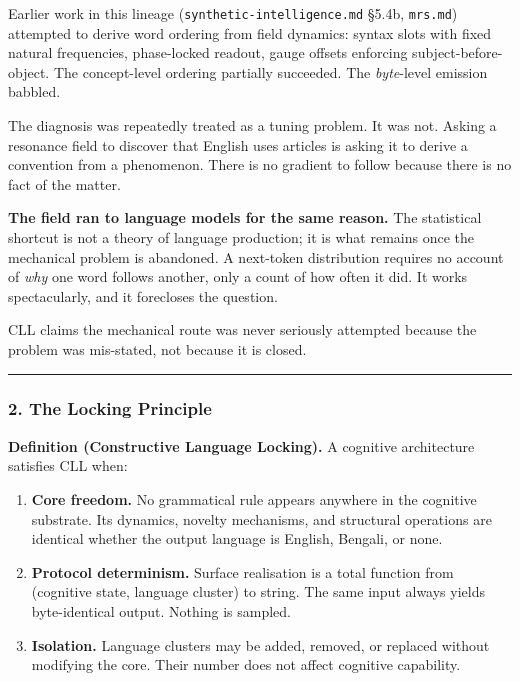 \documentclass[
  11pt,
  a4paper,
]{article}
\providecommand{\tightlist}{%
  \setlength{\itemsep}{0pt}\setlength{\parskip}{0pt}}
\begin{document}
Earlier work in this lineage (\texttt{synthetic-intelligence.md} §5.4b,
\texttt{mrs.md}) attempted to derive word ordering from field dynamics:
syntax slots with fixed natural frequencies, phase-locked readout, gauge
offsets enforcing subject-before-object. The concept-level ordering
partially succeeded. The \emph{byte}-level emission babbled.

The diagnosis was repeatedly treated as a tuning problem. It was not.
Asking a resonance field to discover that English uses articles is
asking it to derive a convention from a phenomenon. There is no gradient
to follow because there is no fact of the matter.

\textbf{The field ran to language models for the same reason.} The
statistical shortcut is not a theory of language production; it is what
remains once the mechanical problem is abandoned. A next-token
distribution requires no account of \emph{why} one word follows another,
only a count of how often it did. It works spectacularly, and it
forecloses the question.

CLL claims the mechanical route was never seriously attempted because
the problem was mis-stated, not because it is closed.

\begin{center}\rule{0.5\linewidth}{0.5pt}\end{center}

\subsubsection{2. The Locking Principle}\label{the-locking-principle}

\textbf{Definition (Constructive Language Locking).} A cognitive
architecture satisfies CLL when:

\begin{enumerate}
\def\labelenumi{\arabic{enumi}.}
\tightlist
\item
  \textbf{Core freedom.} No grammatical rule appears anywhere in the
  cognitive substrate. Its dynamics, novelty mechanisms, and structural
  operations are identical whether the output language is English,
  Bengali, or none.
\item
  \textbf{Protocol determinism.} Surface realisation is a total function
  from (cognitive state, language cluster) to string. The same input
  always yields byte-identical output. Nothing is sampled.
\item
  \textbf{Isolation.} Language clusters may be added, removed, or
  replaced without modifying the core. Their number does not affect
  cognitive capability.
\end{enumerate}
\end{document}
